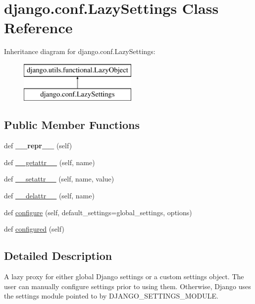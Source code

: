 \hypertarget{classdjango_1_1conf_1_1_lazy_settings}{}\section{django.\+conf.\+Lazy\+Settings Class Reference}
\label{classdjango_1_1conf_1_1_lazy_settings}
Inheritance diagram for django.\+conf.\+Lazy\+Settings\+:\begin{figure}[H]
\begin{center}
\leavevmode
\includegraphics[height=2.000000cm]{classdjango_1_1conf_1_1_lazy_settings}
\end{center}
\end{figure}
\subsection*{Public Member Functions}
\begin{DoxyCompactItemize}
\item 
\mbox{\label{classdjango_1_1conf_1_1_lazy_settings_a88c879904bba9001e759742aa7a40e90}} 
def {\bfseries \+\_\+\+\_\+repr\+\_\+\+\_\+} (self)
\item 
def \mbox{\hyperlink{classdjango_1_1conf_1_1_lazy_settings_ab3502ebf3f7e9748cb667a3c2708254c}{\+\_\+\+\_\+getattr\+\_\+\+\_\+}} (self, name)
\item 
def \mbox{\hyperlink{classdjango_1_1conf_1_1_lazy_settings_a1ee2e0214491decbd4134ea5b4a8f05d}{\+\_\+\+\_\+setattr\+\_\+\+\_\+}} (self, name, value)
\item 
def \mbox{\hyperlink{classdjango_1_1conf_1_1_lazy_settings_aa50ff35ccd3ab835a757e0930aefc6e8}{\+\_\+\+\_\+delattr\+\_\+\+\_\+}} (self, name)
\item 
def \mbox{\hyperlink{classdjango_1_1conf_1_1_lazy_settings_a210e8d008e67658be7e59d0427056da0}{configure}} (self, default\+\_\+settings=global\+\_\+settings, options)
\item 
def \mbox{\hyperlink{classdjango_1_1conf_1_1_lazy_settings_a7ed7bcef467d27210611e7d9dceeac14}{configured}} (self)
\end{DoxyCompactItemize}


\subsection{Detailed Description}
\begin{DoxyVerb}A lazy proxy for either global Django settings or a custom settings object.
The user can manually configure settings prior to using them. Otherwise,
Django uses the settings module pointed to by DJANGO_SETTINGS_MODULE.
\end{DoxyVerb}
 

